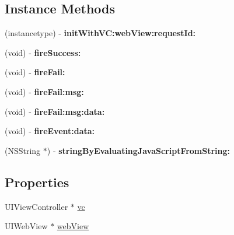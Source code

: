 \subsection*{Instance Methods}
\begin{DoxyCompactItemize}
\item 
\mbox{\label{interface_alibc_hybrid_context_a73ae056fcd130fa9ab1d60c11c7a5af3}} 
(instancetype) -\/ {\bfseries init\+With\+V\+C\+:web\+View\+:request\+Id\+:}
\item 
\mbox{\label{interface_alibc_hybrid_context_a315f41ad774ad29f7da74a8013304146}} 
(void) -\/ {\bfseries fire\+Success\+:}
\item 
\mbox{\label{interface_alibc_hybrid_context_a9ca1863fa3e9c614ecf98b36702feb22}} 
(void) -\/ {\bfseries fire\+Fail\+:}
\item 
\mbox{\label{interface_alibc_hybrid_context_ac984566ff33e277ad2db2c084ad616d7}} 
(void) -\/ {\bfseries fire\+Fail\+:msg\+:}
\item 
\mbox{\label{interface_alibc_hybrid_context_a56d6eadc58c631275e0ab8858047440a}} 
(void) -\/ {\bfseries fire\+Fail\+:msg\+:data\+:}
\item 
\mbox{\label{interface_alibc_hybrid_context_a9355057ff25a205e1e428c6279924951}} 
(void) -\/ {\bfseries fire\+Event\+:data\+:}
\item 
\mbox{\label{interface_alibc_hybrid_context_ab861d5078245375a28d524b763889851}} 
(N\+S\+String $\ast$) -\/ {\bfseries string\+By\+Evaluating\+Java\+Script\+From\+String\+:}
\end{DoxyCompactItemize}
\subsection*{Properties}
\begin{DoxyCompactItemize}
\item 
U\+I\+View\+Controller $\ast$ \mbox{\hyperlink{interface_alibc_hybrid_context_ab7a51d597078510fff06b75aebca3ae2}{vc}}
\item 
U\+I\+Web\+View $\ast$ \mbox{\hyperlink{interface_alibc_hybrid_context_a0191a70e1496fafd8f6700e3c68f28b8}{web\+View}}
\end{DoxyCompactItemize}


